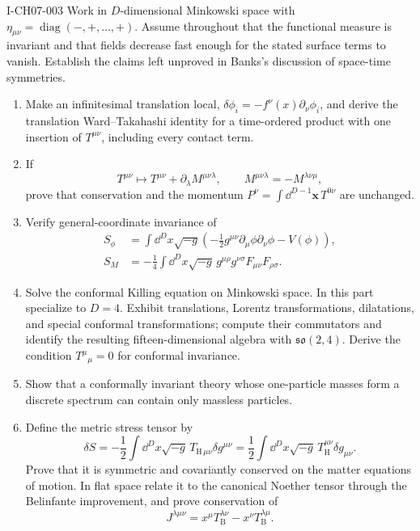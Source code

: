 \begin{exercise}{I-CH07-003}
Work in $D$-dimensional Minkowski space with
$\eta_{\mu\nu}=\operatorname{diag}(-,+,\ldots,+)$.  Assume throughout that the
functional measure is invariant and that fields decrease fast enough for the
stated surface terms to vanish.  Establish the claims left
unproved in Banks's discussion of space-time symmetries.

\begin{enumerate}[label=(\alph*)]
\item Make an infinitesimal translation local,
$\delta\phi_i=-f^\nu(x)\partial_\nu\phi_i$, and derive the translation
Ward--Takahashi identity for a time-ordered product with one insertion of
$T^{\mu\nu}$, including every contact term.

\item If
\[
 T^{\mu\nu}\mapsto T^{\mu\nu}+\partial_\lambda M^{\mu\nu\lambda},
 \qquad M^{\mu\nu\lambda}=-M^{\lambda\nu\mu},
\]
prove that conservation and the momentum
$P^\nu=\int\dd^{D-1}\mathbf x\,T^{0\nu}$ are unchanged.

\item Verify general-coordinate invariance of
\[
\begin{aligned}
 S_\phi&=\int\dd^D x\sqrt{-g}\left(
 -\frac12g^{\mu\nu}\partial_\mu\phi\partial_\nu\phi-V(\phi)\right),\\
 S_M&=-\frac14\int\dd^D x\sqrt{-g}\,
 g^{\mu\rho}g^{\nu\sigma}F_{\mu\nu}F_{\rho\sigma}.
\end{aligned}
\]

\item Solve the conformal Killing equation on Minkowski space.  In this part
specialize to $D=4$.  Exhibit
translations, Lorentz transformations, dilatations, and special conformal
transformations; compute their commutators and identify the resulting
fifteen-dimensional algebra with $\mathfrak{so}(2,4)$.  Derive the condition
$T^\mu{}_{\mu}=0$ for conformal invariance.

\item Show that a conformally invariant theory whose one-particle masses form
a discrete spectrum can contain only massless particles.

\item Define the metric stress tensor by
\[
 \delta S=-\frac12\int\dd^D x\sqrt{-g}\,
 T_{\mathrm H\,\mu\nu}\delta g^{\mu\nu}
 =\frac12\int\dd^D x\sqrt{-g}\,
 T_{\mathrm H}^{\mu\nu}\delta g_{\mu\nu}.
\]
Prove that it is symmetric and covariantly conserved on the matter equations
of motion.  In flat space relate it to the canonical Noether tensor through
the Belinfante improvement, and prove conservation of
\[
 J^{\lambda\mu\nu}
 =x^\mu T_{\mathrm B}^{\lambda\nu}
 -x^\nu T_{\mathrm B}^{\lambda\mu}.
\]


\end{enumerate}
\end{exercise}
